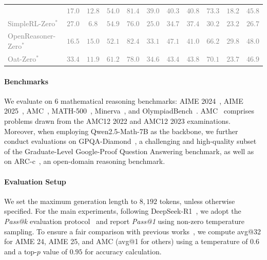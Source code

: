 \begin{table}[!t]
{\begin{tabular}{lccccccc|ccc}
  & \textcolor{gray}{$17.0$} & \textcolor{gray}{$12.8$} & \textcolor{gray}{$54.0$} & \textcolor{gray}{$81.4$} & \textcolor{gray}{$39.0$} & \textcolor{gray}{$40.3$} & \textcolor{gray}{$40.8$} & \textcolor{gray}{$73.3$} & \textcolor{gray}{$18.2$} & \textcolor{gray}{$45.8$} \\
\textcolor{gray}{SimpleRL-Zero$^*$}                                 
  & \textcolor{gray}{$27.0$} & \textcolor{gray}{$6.8$}  & \textcolor{gray}{$54.9$} & \textcolor{gray}{$76.0$} & \textcolor{gray}{$25.0$} & \textcolor{gray}{$34.7$} & \textcolor{gray}{$37.4$} & \textcolor{gray}{$30.2$} & \textcolor{gray}{$23.2$} & \textcolor{gray}{$26.7$} \\
\textcolor{gray}{OpenReasoner-Zero$^*$}                             
  & \textcolor{gray}{$16.5$} & \textcolor{gray}{$15.0$} & \textcolor{gray}{$52.1$} & \textcolor{gray}{$82.4$} & \textcolor{gray}{$33.1$} & \textcolor{gray}{$47.1$} & \textcolor{gray}{$41.0$} & \textcolor{gray}{$66.2$} & \textcolor{gray}{$29.8$} & \textcolor{gray}{$48.0$} \\
\textcolor{gray}{Oat-Zero$^*$}                                  
  & \textcolor{gray}{$33.4$} & \textcolor{gray}{$11.9$} & \textcolor{gray}{$61.2$} & \textcolor{gray}{$78.0$} & \textcolor{gray}{$34.6$} & \textcolor{gray}{$43.4$} & \textcolor{gray}{$43.8$} & \textcolor{gray}{$70.1$} & \textcolor{gray}{$23.7$} & \textcolor{gray}{$46.9$} \\
\bottomrule
\end{tabular}
}
\end{table}

\paragraph{Benchmarks}
We evaluate \mot on $6$ mathematical reasoning benchmarks: AIME 2024~\citep{li2024numinamath},  AIME 2025~\citep{li2024numinamath}, AMC~\citep{li2024numinamath}, MATH-500~\citep{hendrycks2021measuring},  Minerva~\citep{lewkowycz2022solving}, and OlympiadBench~\citep{he2024olympiadbench}.
AMC~\citep{li2024numinamath} comprises problems drawn from the AMC12 2022 and AMC12 2023 examinations.
Moreover, when employing Qwen2.5-Math-7B as the backbone, we further conduct evaluations on GPQA-Diamond~\citep{rein2024gpqa}, a challenging and high-quality subset of the Graduate-Level Google-Proof Question Answering benchmark, as well as on ARC-c~\citep{clark2018think}, an open-domain reasoning benchmark.

\paragraph{Evaluation Setup}
We set the maximum generation length to $8,192$ tokens, unless otherwise specified.
For the main experiments, following DeepSeek-R1~\citep{guo2025deepseek}, we adopt the \emph{Pass@k} evaluation protocol~\citep{chen2021evaluating} and report \emph{Pass@1} using non-zero temperature sampling.
To ensure a fair comparison with previous works~\citep{yan2025learning,fu2025srft}, we compute avg@32 for AIME 24, AIME 25, and AMC (avg@1 for others) using a temperature of $0.6$ and a top-$p$ value of $0.95$ for accuracy calculation.



